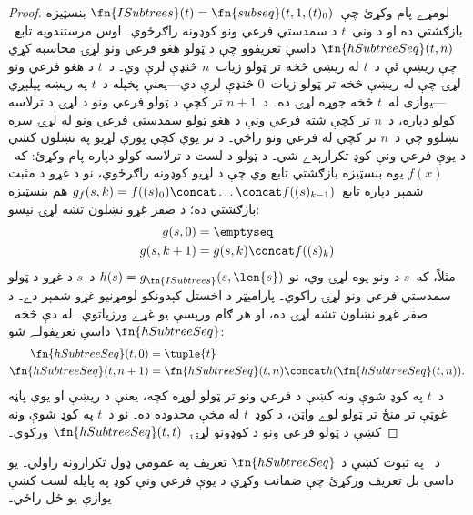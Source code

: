 \documentclass[../../../include/open-logic-section]{subfiles}
\begin{document}
\begin{proof}
  لومړے پام وکړئ چې~$\fn{ISubtrees}(t) = \fn{subseq}(t, 1, (t)_0)$ بنسټيزه بازګشتي ده او د ونې~$t$ د سمدستي فرعي ونو کوډونه راګرځوي۔ اوس مرستندويه تابع~$\fn{hSubtreeSeq}(t,n)$ داسې تعريفوو چې د ټولو هغو فرعي ونو لړۍ محاسبه کړي چې ريښې ئې د~$t$ له ريښې څخه تر ټولو زيات~$n$ څنډې لرې وي۔ د~$t$ د هغو فرعي ونو لړۍ چې له ريښې څخه تر ټولو زيات~$0$ څنډې لرې دي---يعنې پخپله د~$t$ په ريښه پيلېږي---يوازې له~$t$ څخه جوړه لړۍ ده۔ د~$n+1$ تر کچې د ټولو فرعي ونو د لړۍ د ترلاسه کولو دپاره، د~$n$ تر کچې شته فرعي ونې د هغو ټولو سمدستي فرعي ونو له لړۍ سره نښلوو چې د~$n$ تر کچې له فرعي ونو راځي۔
  د تر يوې کچې پورې لړيو په نښلون کښې د يوې فرعي ونې کوډ تکرارېدے شي۔
  د ټولو د لست د ترلاسه کولو دپاره پام وکړئ: که~$f(x)$ يوه بنسټيزه بازګشتي تابع وي چې د لړيو کوډونه راګرځوي، نو د غړو د مثبت شمېر دپاره تابع~$g_f(s,k)=f((s)_0) \concat \dots \concat f((s)_{k-1})$ هم بنسټيزه بازګشتي ده؛ د صفر غړو نښلون تشه لړۍ نيسو:
    \begin{align*}
      g(s, 0) & = \emptyseq\\
      g(s, k+1) & = g(s, k) \concat f((s)_k)
    \end{align*}
    مثلاً، که~$s$ د ونو يوه لړۍ وي، نو $h(s) = g_{\fn{ISubtrees}}(s, \len{s})$ د~$s$ د غړو د ټولو سمدستي فرعي ونو لړۍ راکوي۔
    پاراميټر د اخستل کېدونکو لومړنيو غړو شمېر دے۔ د صفر غړو نښلون تشه لړۍ ده، او هر ګام ورپسې يو غړے ورزياتوي۔
    له دې څخه~$\fn{hSubtreeSeq}$ داسې تعريفولے شو:
    \begin{align*}
      \fn{hSubtreeSeq}(t, 0) & = \tuple{t} \\
      \fn{hSubtreeSeq}(t, n+1) & = \fn{hSubtreeSeq}(t, n) \concat h(\fn{hSubtreeSeq}(t, n)).
    \end{align*}
    د~$t$ په کوډ شوې ونه کښې د فرعي ونو تر ټولو لوړه کچه، يعنې د ريښې او يوې پاڼه غوټې تر منځ تر ټولو لوے واټن، د کوډ~$t$ له مخې محدوده ده۔ نو د~$t$ په کوډ شوې ونه کښې د ټولو فرعي ونو د کوډونو لړۍ~$\fn{hSubtreeSeq}(t, t)$ ورکوي۔
\end{proof}

\begin{prob}
  د~ په ثبوت کښې د $\fn{hSubtreeSeq}$ تعريف په عمومي ډول تکرارونه راولي۔ يو داسې بل تعريف ورکړئ چې ضمانت وکړي د يوې فرعي ونې کوډ په پايله لست کښې يوازې يو ځل راځي۔
\end{prob}
\end{document}
